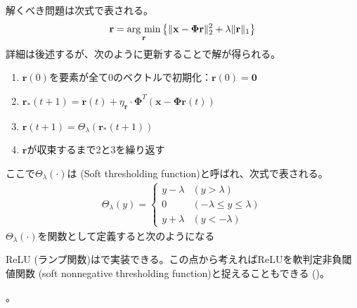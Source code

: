 \documentclass[letterpaper,10pt,english]{sphinxmanual}
\begin{document}
解くべき問題は次式で表される。
\begin{equation*}
\begin{split}
\mathbf{r} = \mathop{\rm arg~min}\limits_{\mathbf{r}}\left\{\|\mathbf{x}-\mathbf{\Phi}\mathbf{r}\|^2_2+\lambda\|\mathbf{r}\|_1\right\}
\end{split}
\end{equation*}
詳細は後述するが、次のように更新することで解が得られる。
\begin{enumerate}
%
\item {} 
\(\mathbf{r}(0)\)を要素が全て0のベクトルで初期化：\(\mathbf{r}(0)=\mathbf{0}\)

\item {} 
\(\mathbf{r}_*(t+1)=\mathbf{r}(t)+\eta_\mathbf{r}\cdot \mathbf{\Phi}^T(\mathbf{x}-\mathbf{\Phi}\mathbf{r}(t))\)

\item {} 
\(\mathbf{r}(t+1) = \Theta_\lambda(\mathbf{r}_*(t+1))\)

\item {} 
\(\mathbf{r}\)が収束するまで2と3を繰り返す

\end{enumerate}

ここで\(\Theta_\lambda(\cdot)\)は (Soft thresholding function)と呼ばれ、次式で表される。
\begin{equation*}
\begin{split}
\Theta_\lambda(y)= 
\begin{cases} 
y-\lambda & (y>\lambda)\\ 
0 & (-\lambda\leq y\leq\lambda)\\ 
 y+\lambda & (y<-\lambda) 
\end{cases}
\end{split}
\end{equation*}
\(\Theta_\lambda(\cdot)\)を関数として定義すると次のようになる %
\begin{footnote}[3]\sphinxAtStartFootnote
ReLU (ランプ関数)はで実装できる。この点から考えればReLUを軟判定非負閾値関数 (soft nonnegative thresholding function)と捉えることもできる ()。
%
\end{footnote}。

\begin{sphinxVerbatim}[commandchars=\\\{\}]
  
            
\end{sphinxVerbatim}
\end{document}
